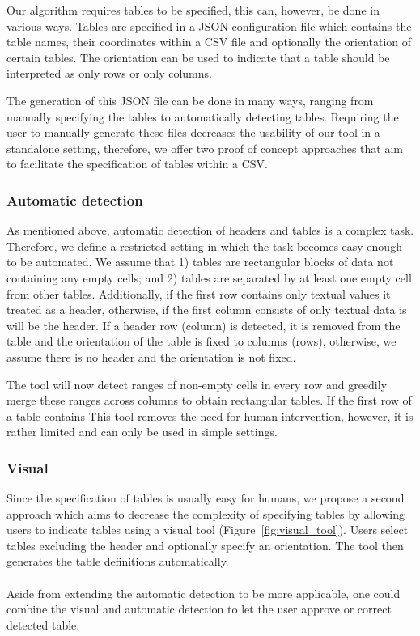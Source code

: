\documentclass{IEEEtran}
\theoremstyle{definition}
\begin{document}
Our algorithm requires tables to be specified, this can, however, be done in various ways.
Tables are specified in a JSON configuration file which contains the table names, their coordinates within a CSV file and optionally the orientation of certain tables.
The orientation can be used to indicate that a table should be interpreted as only rows or only columns.

The generation of this JSON file can be done in many ways, ranging from manually specifying the tables to automatically detecting tables.
Requiring the user to manually generate these files decreases the usability of our tool in a standalone setting, therefore, we offer two proof of concept approaches that aim to facilitate the specification of tables within a CSV.





\subsubsection{Automatic detection}
As mentioned above, automatic detection of headers and tables is a complex task.
Therefore, we define a restricted setting in which the task becomes easy enough to be automated.
We assume that 1) tables are rectangular blocks of data not containing any empty cells; and 2) tables are separated by at least one empty cell from other tables.
Additionally, if the first row contains only textual values it treated as a header, otherwise, if the first column consists of only textual data is will be the header.
If a header row (column) is detected, it is removed from the table and the orientation of the table is fixed to columns (rows), otherwise, we assume there is no header and the orientation is not fixed.

The tool will now detect ranges of non-empty cells in every row and greedily merge these ranges across columns to obtain rectangular tables.
If the first row of a table contains 
This tool removes the need for human intervention, however, it is rather limited and can only be used in simple settings.





\subsubsection{Visual}
Since the specification of tables is usually easy for humans, we propose a second approach which aims to decrease the complexity of specifying tables by allowing users to indicate tables using a visual tool (Figure~\ref{fig:visual_tool}).
Users select tables excluding the header and optionally specify an orientation.
The tool then generates the table definitions automatically.
\\\\
Aside from extending the automatic detection to be more applicable, one could combine the visual and automatic detection to let the user approve or correct detected table.
\end{document}
